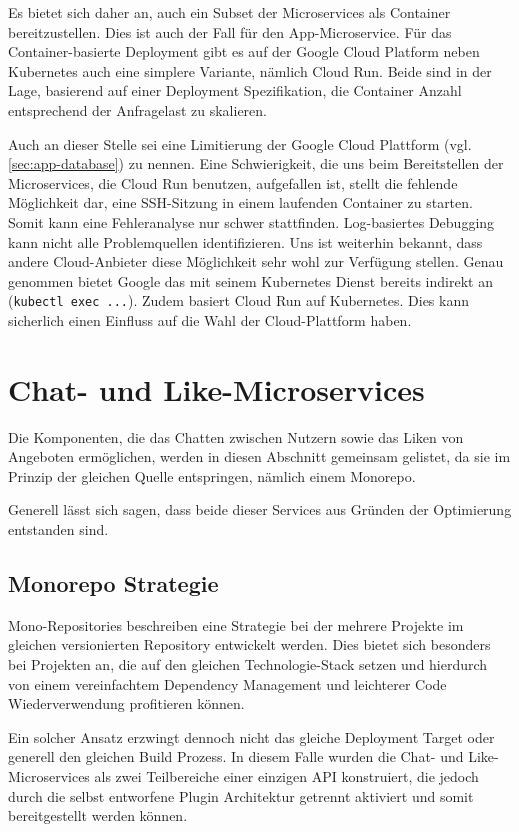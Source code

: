 \documentclass{article}
\begin{document}
Es bietet sich daher an, auch ein Subset der Microservices als Container bereitzustellen. Dies ist auch der Fall für den App-Microservice.  Für das Container-basierte Deployment gibt es auf der Google Cloud Platform neben Kubernetes auch eine simplere Variante, nämlich Cloud Run. Beide sind in der Lage, basierend auf einer Deployment Spezifikation, die Container Anzahl entsprechend der Anfragelast zu skalieren.

Auch an dieser Stelle sei eine Limitierung der Google Cloud Plattform (vgl. \autoref{sec:app-database}) zu nennen. Eine Schwierigkeit, die uns beim Bereitstellen der Microservices, die Cloud Run benutzen, aufgefallen ist, stellt die fehlende Möglichkeit dar, eine SSH-Sitzung in einem laufenden Container zu starten. Somit kann eine Fehleranalyse nur schwer stattfinden. Log-basiertes Debugging kann nicht alle Problemquellen identifizieren. Uns ist weiterhin bekannt, dass andere Cloud-Anbieter diese Möglichkeit sehr wohl zur Verfügung stellen. Genau genommen bietet Google das mit seinem Kubernetes Dienst bereits indirekt an (\texttt{kubectl exec ...}). Zudem basiert Cloud Run auf Kubernetes. Dies kann sicherlich einen Einfluss auf die Wahl der Cloud-Plattform haben.


\section{Chat- und Like-Microservices} %

Die Komponenten, die das Chatten zwischen Nutzern sowie das Liken von Angeboten ermöglichen, werden in diesen Abschnitt gemeinsam gelistet, da sie im Prinzip der gleichen Quelle entspringen, nämlich einem Monorepo. 

Generell lässt sich sagen, dass beide dieser Services aus Gründen der Optimierung entstanden sind.

\subsection{Monorepo Strategie}

Mono-Repositories beschreiben eine Strategie bei der mehrere Projekte im gleichen versionierten Repository entwickelt werden. Dies bietet sich besonders bei Projekten an, die auf den gleichen Technologie-Stack setzen und hierdurch von einem vereinfachtem Dependency Management und leichterer Code Wiederverwendung profitieren können.

Ein solcher Ansatz erzwingt dennoch nicht das gleiche Deployment Target oder generell den gleichen Build Prozess. In diesem Falle wurden die Chat- und Like-Microservices als zwei Teilbereiche einer einzigen API konstruiert, die jedoch durch die selbst entworfene Plugin Architektur getrennt aktiviert und somit bereitgestellt werden können.
\end{document}
